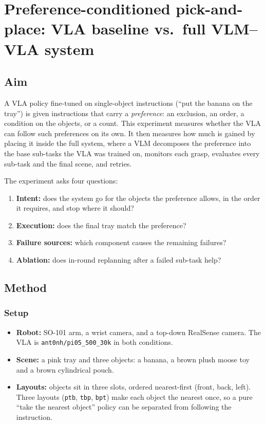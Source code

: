 
\section{Preference-conditioned pick-and-place: VLA baseline vs.\ full VLM--VLA system}
\label{sec:pref-eval}

\subsection{Aim}

A VLA policy fine-tuned on single-object instructions (``put the banana on the tray'') is
given instructions that carry a \emph{preference}: an exclusion, an order, a condition on
the objects, or a count. This experiment measures whether the VLA can follow such
preferences on its own. It then measures how much is gained by placing it inside the full
system, where a VLM decomposes the preference into the base sub-tasks the VLA was trained
on, monitors each grasp, evaluates every sub-task and the final scene, and retries.

The experiment asks four questions:
\begin{enumerate}
  \item \textbf{Intent:} does the system go for the objects the preference allows, in the
    order it requires, and stop where it should?
  \item \textbf{Execution:} does the final tray match the preference?
  \item \textbf{Failure sources:} which component causes the remaining failures?
  \item \textbf{Ablation:} does in-round replanning after a failed sub-task help?
\end{enumerate}

\subsection{Method}

\subsubsection{Setup}
\begin{itemize}
  \item \textbf{Robot:} SO-101 arm, a wrist camera, and a top-down RealSense camera. The
    VLA is \texttt{ant0nh/pi05\_500\_30k} in both conditions.
  \item \textbf{Scene:} a pink tray and three objects: a banana, a brown plush moose toy
    and a brown cylindrical pouch.
  \item \textbf{Layouts:} objects sit in three slots, ordered nearest-first (front, back,
    left). Three layouts (\texttt{ptb}, \texttt{tbp}, \texttt{bpt}) make each object the
    nearest once, so a pure ``take the nearest object'' policy can be separated from
    following the instruction.
\end{itemize}

